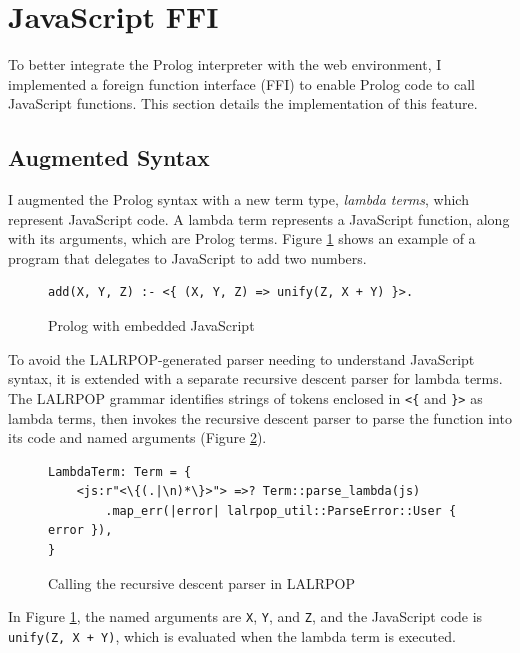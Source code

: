
\section{JavaScript FFI}

\label{sec:js-ffi}

To better integrate the Prolog interpreter with the web environment, I implemented a foreign function interface (FFI) to enable Prolog code to call JavaScript functions. This section details the implementation of this feature.

\subsection{Augmented Syntax}

I augmented the Prolog syntax with a new term type, \emph{lambda terms}, which represent JavaScript code. A lambda term represents a JavaScript function, along with its arguments, which are Prolog terms. Figure \ref{fig:js-in-prolog} shows an example of a program that delegates to JavaScript to add two numbers.

\begin{figure}[H]
\centering
\begin{verbatim}
add(X, Y, Z) :- <{ (X, Y, Z) => unify(Z, X + Y) }>.
\end{verbatim}
\caption{Prolog with embedded JavaScript}
\label{fig:js-in-prolog}
\end{figure}

To avoid the LALRPOP-generated parser needing to understand JavaScript syntax, it is extended with a separate recursive descent parser for lambda terms. The LALRPOP grammar identifies strings of tokens enclosed in \texttt{<\{} and \texttt{\}>} as lambda terms, then invokes the recursive descent parser to parse the function into its code and named arguments (Figure \ref{fig:js-grammar}).

\begin{figure}[H]
\centering
\begin{verbatim}
LambdaTerm: Term = {
    <js:r"<\{(.|\n)*\}>"> =>? Term::parse_lambda(js)
        .map_err(|error| lalrpop_util::ParseError::User { error }),
}
\end{verbatim}
\caption{Calling the recursive descent parser in LALRPOP}
\label{fig:js-grammar}
\end{figure}

In Figure \ref{fig:js-in-prolog}, the named arguments are \texttt{X}, \texttt{Y}, and \texttt{Z}, and the JavaScript code is \texttt{unify(Z, X + Y)}, which is evaluated when the lambda term is executed.

